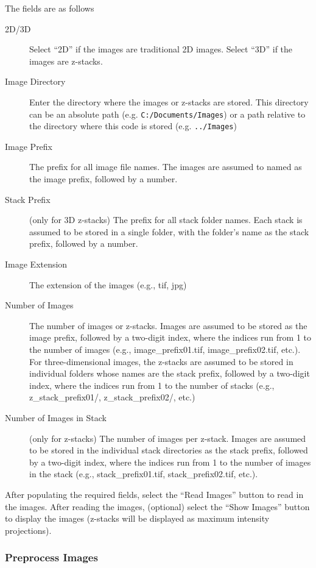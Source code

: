 \documentclass[12pt]{article}
\begin{document}
The fields are as follows
\begin{description}
%
\item[2D/3D] Select ``2D'' if the images are traditional 2D images. Select ``3D'' if the images are z-stacks.
%
\item[Image Directory] Enter the directory where the images or z-stacks are stored. This directory can be an absolute path (e.g. \texttt{C:/Documents/Images}) or a path relative to the directory where this code is stored (e.g. \texttt{../Images})
%
\item[Image Prefix] The prefix for all image file names. The images are assumed to named as the image prefix, followed by a number. 
%
\item[Stack Prefix] (only for 3D z-stacks) The prefix for all stack folder names. Each stack is assumed to be stored in a single folder, with the folder's name as the stack prefix, followed by a number. 
%
\item[Image Extension] The extension of the images (e.g., tif, jpg)
%
\item[Number of Images] The number of images or z-stacks. Images are assumed to be stored as the image prefix, followed by a two-digit index, where the indices run from 1 to the number of images (e.g., image\_prefix01.tif, image\_prefix02.tif, etc.). For three-dimensional images, the z-stacks are assumed to be stored in individual folders whose names are the stack prefix, followed by a two-digit index, where the indices run from 1 to the number of stacks (e.g., z\_stack\_prefix01/, z\_stack\_prefix02/, etc.)
%
\item[Number of Images in Stack] (only for z-stacks) The number of images per z-stack. Images are assumed to be stored in the individual stack directories as the stack prefix, followed by a two-digit index, where the indices run from 1 to the number of images in the stack (e.g., stack\_prefix01.tif, stack\_prefix02.tif, etc.). 
%
\end{description}

After populating the required fields, select the ``Read Images'' button to read in the images.
%
After reading the images, (optional) select the ``Show Images'' button to display the images (z-stacks will be displayed as maximum intensity projections).

\subsubsection{Preprocess Images}
\end{document}
